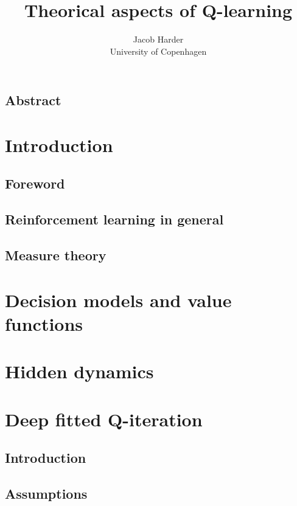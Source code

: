 \documentclass{article}
\title{Theorical aspects of Q-learning}
\author{Jacob Harder \\ University of Copenhagen}
\begin{document}


\subsection*{Abstract}


\newpage
\renewcommand{\baselinestretch}{1.0}\normalsize
\tableofcontents
\renewcommand{\baselinestretch}{1.3}\normalsize

\newpage
\section{Introduction}
\subsection{Foreword}


\subsection{Reinforcement learning in general}

\subsection{Measure theory}


\section{Decision models and value functions}


\section{Hidden dynamics}


\section{Deep fitted Q-iteration}
\subsection{Introduction}

\subsection{Assumptions}

\end{document}
